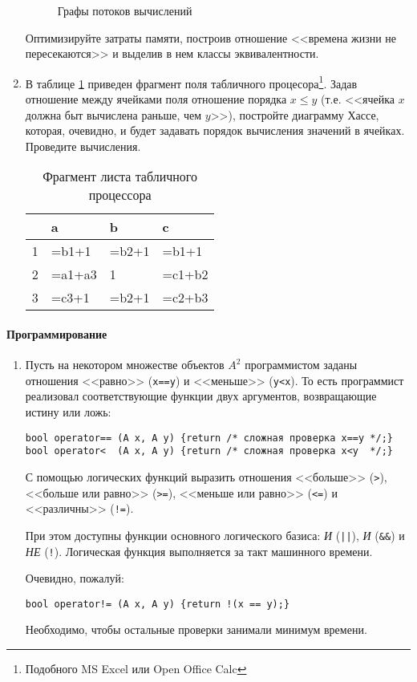 \begin{enumerate}
\begin{figure}
        \caption{Графы потоков вычислений}
        \label{fig:bo:calcFlowTask1}
    \end{figure}
    
    Оптимизируйте затраты памяти, построив отношение <<времена жизни не пересекаются>> и выделив в нем классы эквивалентности.

    \item В таблице \ref{table:bo:excel} приведен фрагмент поля табличного процесора\footnote{Подобного MS Excel или Open Office Calc}. Задав отношение между ячейками поля отношение порядка $x\leq y$ (т.е. <<ячейка $x$ должна быт вычислена раньше, чем $y$>>), постройте диаграмму Хассе, которая, очевидно, и будет задавать порядок вычисления значений в ячейках. Проведите вычисления.
    
    \begin{table}
        \centering
        \begin{tabular}{|l||l|l|l|}
            \hline
                &a      &b      &c     \\
            \hline\hline
            1   &=b1+1  &=b2+1  &=b1+1 \\ \hline
            2   &=a1+a3 &1      &=c1+b2\\ \hline
            3   &=c3+1  &=b2+1  &=c2+b3\\ \hline
        \end{tabular}
        \caption{Фрагмент листа табличного процессора}
        \label{table:bo:excel}
    \end{table}

\end{enumerate}


\paragraph{Программирование}

\begin{enumerate}
    \item Пусть на некотором множестве объектов $A^2$ программистом заданы отношения <<равно>> (\verb"x==y") и <<меньше>> (\verb"y<x"). То есть программист реализовал соответствующие функции двух аргументов, возвращающие истину или ложь:
\begin{verbatim}    
bool operator== (A x, A y) {return /* сложная проверка x==y */;}
bool operator<  (A x, A y) {return /* сложная проверка x<y  */;}
\end{verbatim}    
    С помощью логических функций выразить отношения <<больше>> (\verb">"), <<больше или равно>>  (\verb">="), <<меньше или равно>>  (\verb"<=") и <<различны>>  (\verb"!="). 
    
    При этом доступны функции основного логического базиса: \emph{И} (\verb"||"), \emph{И} (\verb"&&") и \emph{НЕ} (\verb"!"). Логическая функция выполняется за такт машинного времени.
    
    Очевидно, пожалуй:
\begin{verbatim}    
bool operator!= (A x, A y) {return !(x == y);}
\end{verbatim}    

    Необходимо, чтобы остальные проверки занимали минимум времени.
\end{enumerate}
